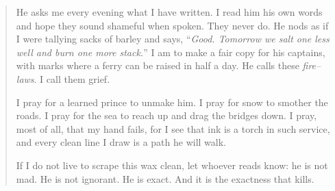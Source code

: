 \documentclass[11pt]{article}
\begin{document}
\begin{quote}
He asks me every evening what I have written. I read him his own words and hope they sound shameful when spoken. They never do. He nods as if I were tallying sacks of barley and says, “\emph{Good. Tomorrow we salt one less well and burn one more stack.}” I am to make a fair copy for his captains, with marks where a ferry can be raised in half a day. He calls these \emph{fire–laws}. I call them grief.

I pray for a learned prince to unmake him. I pray for snow to smother the roads. I pray for the sea to reach up and drag the bridges down. I pray, most of all, that my hand fails, for I see that ink is a torch in such service, and every clean line I draw is a path he will walk.

If I do not live to scrape this wax clean, let whoever reads know: he is not mad. He is not ignorant. He is exact. And it is the exactness that kills.
\end{quote}

\clearpage
\end{document}
